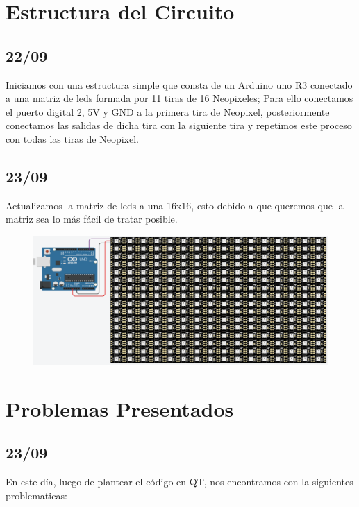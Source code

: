 \documentclass{article}
\begin{document}
    
\section{Estructura del Circuito}
\label{circuito}
    \vspace{0.1cm}

    \begin{flushleft}
        \subsection{22/09}
        Iniciamos con una estructura simple que consta de un Arduino uno R3 conectado a una matriz de leds formada por 11 tiras de 16 Neopixeles; Para ello conectamos el puerto digital 2, 5V y GND a la primera tira de Neopixel, posteriormente conectamos las salidas de dicha tira con la siguiente tira y repetimos este proceso con todas las tiras de Neopixel.
    \end{flushleft}
    
    \begin{flushleft}
        \subsection{23/09}
        Actualizamos la matriz de leds a una 16x16, esto debido a que queremos que la matriz sea lo más fácil de tratar posible.
    \end{flushleft}
    
    \begin{figure}[h]
    \includegraphics[width=12cm]{Images/leds.png}
    \centering
    \label{fig:leds}
    \end{figure}
    \vspace{0.5cm}
    
\section{Problemas Presentados}
\label{problemas}
    \begin{flushleft}
     \subsection{23/09}
     En este día, luego de plantear el código en QT, nos encontramos con la siguientes problematicas:
    \end{flushleft}
    
\end{document}
